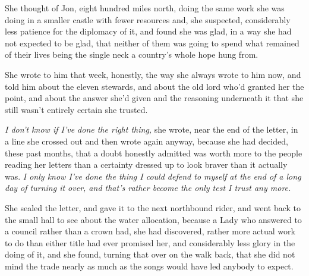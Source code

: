 She thought of Jon, eight hundred miles north, doing the same work she was doing in a smaller castle with fewer resources and, she suspected, considerably less patience for the diplomacy of it, and found she was glad, in a way she had not expected to be glad, that neither of them was going to spend what remained of their lives being the single neck a country’s whole hope hung from.

\sceneBreak

She wrote to him that week, honestly, the way she always wrote to him now, and told him about the eleven stewards, and about the old lord who’d granted her the point, and about the answer she’d given and the reasoning underneath it that she still wasn’t entirely certain she trusted.

\textit{I don’t know if I’ve done the right thing,} she wrote, near the end of the letter, in a line she crossed out and then wrote again anyway, because she had decided, these past months, that a doubt honestly admitted was worth more to the people reading her letters than a certainty dressed up to look braver than it actually was. \textit{I only know I’ve done the thing I could defend to myself at the end of a long day of turning it over, and that’s rather become the only test I trust any more.}

She sealed the letter, and gave it to the next northbound rider, and went back to the small hall to see about the water allocation, because a Lady who answered to a council rather than a crown had, she had discovered, rather more actual work to do than either title had ever promised her, and considerably less glory in the doing of it, and she found, turning that over on the walk back, that she did not mind the trade nearly as much as the songs would have led anybody to expect.